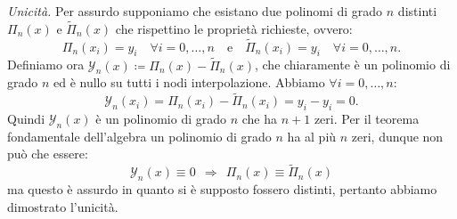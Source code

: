 \textit{Unicità.} Per assurdo supponiamo che esistano due polinomi di grado $n$ distinti $\Pi _{n}(x)$ e $\tilde{\Pi }_{n}(x)$ che rispettino le proprietà richieste, ovvero:
\begin{equation*}
\Pi _{n}( x_{i}) =y_{i} \quad \forall i=0,\dotsc ,n \quad \text{e} \quad \tilde{\Pi }_{n}( x_{i}) =y_{i} \quad \forall i=0,\dotsc ,n.
\end{equation*}
Definiamo ora $\mathcal{Y}_{n}(x) \coloneqq \Pi _{n}(x) -\tilde{\Pi }_{n}(x)$, che chiaramente è un polinomio di grado $n$ ed è nullo su tutti i nodi interpolazione. Abbiamo $\forall i=0,\dotsc ,n$:
$$
	\mathcal{Y}_{n}( x_{i})
	=\Pi _{n}( x_{i}) -\tilde{\Pi }_{n}( x_{i})
	=y_{i} -y_{i}
	=0.
$$
Quindi $\mathcal{Y}_{n}(x)$ è un polinomio di grado $n$ che ha $n+1$ zeri. Per il teorema fondamentale dell'algebra un polinomio di grado $n$ ha al più $n$ zeri, dunque non può che essere:
\begin{equation*}
\mathcal{Y}_{n}(x) \equiv 0\ \ \Rightarrow \ \ \Pi _{n}(x) \equiv \tilde{\Pi }_{n}(x)
\end{equation*}
ma questo è assurdo in quanto si è supposto fossero distinti, pertanto abbiamo dimostrato l'unicità. \textqed

